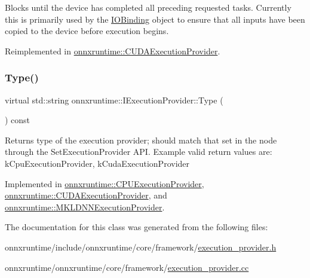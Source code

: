 Blocks until the device has completed all preceding requested tasks. Currently this is primarily used by the \mbox{\hyperlink{classonnxruntime_1_1IOBinding}{I\+O\+Binding}} object to ensure that all inputs have been copied to the device before execution begins. 

Reimplemented in \mbox{\hyperlink{classonnxruntime_1_1CUDAExecutionProvider_a4f3479126d1191bb1074c4b953b3ef87}{onnxruntime\+::\+C\+U\+D\+A\+Execution\+Provider}}.

\mbox{\label{classonnxruntime_1_1IExecutionProvider_a6bfeb7af172299bcc6083a418b01fac1}} 
\subsubsection{\texorpdfstring{Type()}{Type()}}
{\footnotesize\ttfamily virtual std\+::string onnxruntime\+::\+I\+Execution\+Provider\+::\+Type (\begin{DoxyParamCaption}{ }\end{DoxyParamCaption}) const\hspace{0.3cm}{\ttfamily [pure virtual]}}

\begin{DoxyReturn}{Returns}
type of the execution provider; should match that set in the node through the Set\+Execution\+Provider A\+PI. Example valid return values are\+: k\+Cpu\+Execution\+Provider, k\+Cuda\+Execution\+Provider 
\end{DoxyReturn}


Implemented in \mbox{\hyperlink{classonnxruntime_1_1CPUExecutionProvider_a419ca314cd97d0561226e90755b29da2}{onnxruntime\+::\+C\+P\+U\+Execution\+Provider}}, \mbox{\hyperlink{classonnxruntime_1_1CUDAExecutionProvider_aba2225328bd739b5e6ef4be06557985b}{onnxruntime\+::\+C\+U\+D\+A\+Execution\+Provider}}, and \mbox{\hyperlink{classonnxruntime_1_1MKLDNNExecutionProvider_a9d13e248253f882664260bb3e7d093b9}{onnxruntime\+::\+M\+K\+L\+D\+N\+N\+Execution\+Provider}}.



The documentation for this class was generated from the following files\+:\begin{DoxyCompactItemize}
\item 
onnxruntime/include/onnxruntime/core/framework/\mbox{\hyperlink{execution__provider_8h}{execution\+\_\+provider.\+h}}\item 
onnxruntime/onnxruntime/core/framework/\mbox{\hyperlink{execution__provider_8cc}{execution\+\_\+provider.\+cc}}\end{DoxyCompactItemize}

